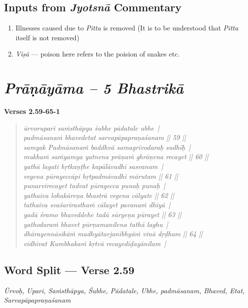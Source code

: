\subsection*{Inputs from \textit{Jyotsnā} Commentary}


\begin{enumerate}
\item Illnesses caused due to \textit{Pitta} is removed (It is to be understood that \textit{Pitta} itself is not removed)
\item \textit{Viṣā} --- poison here refers to the poision of snakes etc.
\end{enumerate}

\section*{\textit{Prāṇāyāma – 5 Bhastrikā}}

\noindent \textbf{Verses 2.59-65-1}

\begin{verse}
\textit{ūrvorupari saṁsthāpya śubhe pādatale ubhe |\\
padmāsanaṁ bhavedetat sarvapāpapraṇaśanam || 59 ||\\
samyak Padmāsanaṁ baddhvā samagrīvodaraḥ sudhīḥ |\\ 
mukhaṁ saṁyamya yatnena prāṇaṁ ghrāṇena recayet || 60 ||\\
yathā lagati hṛtkaṇṭhe kapālāvadhi sasvanam |\\
vegena pūrayeccāpi hṛtpadmāvadhi mārutam || 61 ||\\
punarvirecayet tadvat pūrayecca punaḥ punaḥ |\\
yathaiva lohakāreṇa bhastrā vegena cālyate || 62 ||\\
tathaiva svaśarīrasthaṁ cālayet pavanaṁ dhiyā |\\
yadā śramo bhaveddehe tadā sūryeṇa pūrayet || 63 ||\\
yathodaraṁ bhavet pūrṇamanilena tathā laghu |\\
dhārayennāsikāṁ madhyātarjanībhyāṁ vinā dṛḍham || 64 ||\\
vidhivat Kumbhakaṁ kṛtvā recayediḍayānilam |}
\end{verse}

\subsection*{Word Split --- Verse 2.59}


\textit{Ūrvoḥ, Upari, Saṁsthāpya, Śubhe, Pādatale, Ubhe, padmāsanam, Bhaved, Etat, Sarvapāpapraṇaśanam}

